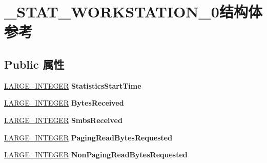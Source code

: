 \hypertarget{struct___s_t_a_t___w_o_r_k_s_t_a_t_i_o_n__0}{}\section{\+\_\+\+S\+T\+A\+T\+\_\+\+W\+O\+R\+K\+S\+T\+A\+T\+I\+O\+N\+\_\+0结构体 参考}
\label{struct___s_t_a_t___w_o_r_k_s_t_a_t_i_o_n__0}
\subsection*{Public 属性}
\begin{DoxyCompactItemize}
\item 
\mbox{\label{struct___s_t_a_t___w_o_r_k_s_t_a_t_i_o_n__0_a2f7b69b4e14082875ae562995125c82f}} 
\hyperlink{union___l_a_r_g_e___i_n_t_e_g_e_r}{L\+A\+R\+G\+E\+\_\+\+I\+N\+T\+E\+G\+ER} {\bfseries Statistics\+Start\+Time}
\item 
\mbox{\label{struct___s_t_a_t___w_o_r_k_s_t_a_t_i_o_n__0_a7cf0570ef4055e0794fe173988d327b0}} 
\hyperlink{union___l_a_r_g_e___i_n_t_e_g_e_r}{L\+A\+R\+G\+E\+\_\+\+I\+N\+T\+E\+G\+ER} {\bfseries Bytes\+Received}
\item 
\mbox{\label{struct___s_t_a_t___w_o_r_k_s_t_a_t_i_o_n__0_ad57193f1c987993cce86f240dfce2b5b}} 
\hyperlink{union___l_a_r_g_e___i_n_t_e_g_e_r}{L\+A\+R\+G\+E\+\_\+\+I\+N\+T\+E\+G\+ER} {\bfseries Smbs\+Received}
\item 
\mbox{\label{struct___s_t_a_t___w_o_r_k_s_t_a_t_i_o_n__0_ae40d49be899169863c4d97383eb7c0b4}} 
\hyperlink{union___l_a_r_g_e___i_n_t_e_g_e_r}{L\+A\+R\+G\+E\+\_\+\+I\+N\+T\+E\+G\+ER} {\bfseries Paging\+Read\+Bytes\+Requested}
\item 
\mbox{\label{struct___s_t_a_t___w_o_r_k_s_t_a_t_i_o_n__0_a7483c8840208bb8caccabbd7b5bd4502}} 
\hyperlink{union___l_a_r_g_e___i_n_t_e_g_e_r}{L\+A\+R\+G\+E\+\_\+\+I\+N\+T\+E\+G\+ER} {\bfseries Non\+Paging\+Read\+Bytes\+Requested}
\item 
\mbox{\label{struct___s_t_a_t___w_o_r_k_s_t_a_t_i_o_n__0_a42e40af07996beb44f6833a49154e140}} 

\end{DoxyCompactItemize}
